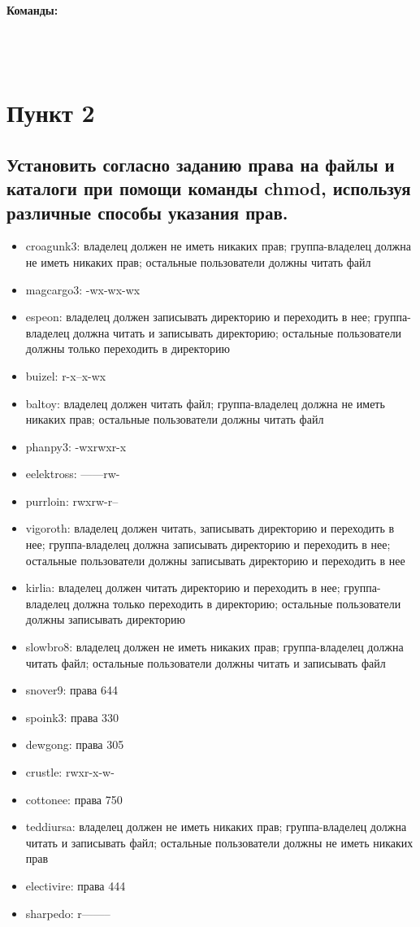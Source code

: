 \documentclass[12pt,onecolumn]{article}
\begin{document}
\paragraph{Команды:}\\
\hfill\\

\section{Пункт 2}
\subsection{Установить согласно заданию права на файлы и каталоги при помощи команды chmod, используя различные способы указания прав.}
\begin{itemize}  
\item croagunk3: владелец должен не иметь никаких прав; группа-владелец должна не иметь никаких прав; остальные пользователи должны читать файл
\item magcargo3: -wx-wx-wx
\item espeon: владелец должен записывать директорию и переходить в нее; группа-владелец должна читать и записывать директорию; остальные пользователи должны только переходить в директорию
\item buizel: r-x--x-wx
\item baltoy: владелец должен читать файл; группа-владелец должна не иметь никаких прав; остальные пользователи должны читать файл
\item phanpy3: -wxrwxr-x
\item eelektross: ------rw-
\item purrloin: rwxrw-r--
\item vigoroth: владелец должен читать, записывать директорию и переходить в нее; группа-владелец должна записывать директорию и переходить в нее; остальные пользователи должны записывать директорию и переходить в нее
\item kirlia: владелец должен читать директорию и переходить в нее; группа-владелец должна только переходить в директорию; остальные пользователи должны записывать директорию
\item slowbro8: владелец должен не иметь никаких прав; группа-владелец должна читать файл; остальные пользователи должны читать и записывать файл
\item snover9: права 644
\item spoink3: права 330
\item dewgong: права 305
\item crustle: rwxr-x-w-
\item cottonee: права 750
\item teddiursa: владелец должен не иметь никаких прав; группа-владелец должна читать и записывать файл; остальные пользователи должны не иметь никаких прав
\item electivire: права 444
\item sharpedo: r--------
\end{itemize}
\end{document}
